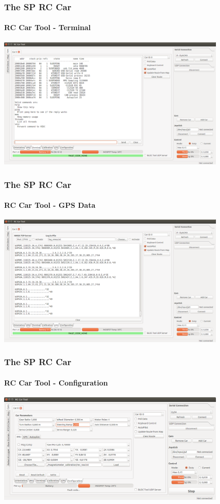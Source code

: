 \documentclass[aspectratio=169,electronics,notopline]{beamer}
\begin{document}
\begin{frame} 
\frametitle{The SP RC Car}
\framesubtitle{RC Car Tool - Terminal}
\begin{center}
	\includegraphics[width=11cm]{Figures/GUI/car_terminal.png}
\end{center}
\end{frame}

\begin{frame} 
\frametitle{The SP RC Car}
\framesubtitle{RC Car Tool - GPS Data}
\begin{center}
	\includegraphics[width=11cm]{Figures/GUI/car_gps.png}
\end{center}
\end{frame}

\begin{frame} 
\frametitle{The SP RC Car}
\framesubtitle{RC Car Tool - Configuration}
\begin{center}
	\includegraphics[width=11cm]{Figures/GUI/car_config.png}
\end{center}
\end{frame}
\end{document}
